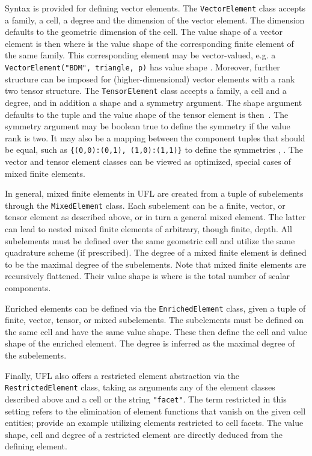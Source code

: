 \documentclass[prodmode,acmtoms]{acmsmall}
\newcommand{\uflc}[1]{\texttt{#1}}
\begin{document}
Syntax is provided for defining vector elements. The \uflc{VectorElement}
class accepts a family, a cell, a degree and the dimension of the
vector element. The dimension defaults to the geometric dimension 
of the cell. The value shape of a vector element is then 
where  is the value shape of the corresponding finite element
of the same family. This corresponding element may be vector-valued,
e.g. a \uflc{VectorElement("BDM", triangle, p)} has value shape
. Moreover, further structure can be imposed for
(higher-dimensional) vector elements with a rank two tensor structure. The
\uflc{TensorElement} class accepts a family, a cell and a degree, and in
addition a shape and a symmetry argument. The shape argument defaults
to the tuple  and the value shape of the tensor element is
then~. The symmetry argument may be boolean true to define
the symmetry  if the value rank is two. It may also
be a mapping between the component tuples that should be equal, such
as \uflc{\{(0,0):(0,1),
  (1,0):(1,1)\}} to define the symmetries ,
.  The vector and tensor element classes can be viewed
as optimized, special cases of mixed finite elements.

In general, mixed finite elements in UFL are created from a tuple of
subelements through the \uflc{MixedElement} class. Each subelement can
be a finite, vector, or tensor element as described above, or in turn
a general mixed element. The latter can lead to nested mixed finite
elements of arbitrary, though finite, depth. All subelements must be
defined over the same geometric cell and utilize the same quadrature
scheme (if prescribed). The degree of a mixed finite element is
defined to be the maximal degree of the subelements. Note that mixed
finite elements are recursively flattened. Their value shape is  where  is the total number of scalar components.

Enriched elements can be defined via the \uflc{EnrichedElement} class,
given a tuple of finite, vector, tensor, or mixed subelements. The
subelements must be defined on the same cell and have the same value
shape. These then define the cell and value shape of the enriched
element. The degree is inferred as the maximal degree of the
subelements.

Finally, UFL also offers a restricted element abstraction via the
\uflc{RestrictedElement} class, taking as arguments any of the element
classes described above and a cell or the string \uflc{"facet"}.
The term restricted in this
setting refers to the elimination of element functions that vanish on
the given cell entities; \citet{labeur:2012} provide an example utilizing
elements restricted to cell facets. The value shape, cell and degree
of a restricted element are directly deduced from the defining
element.
\end{document}
